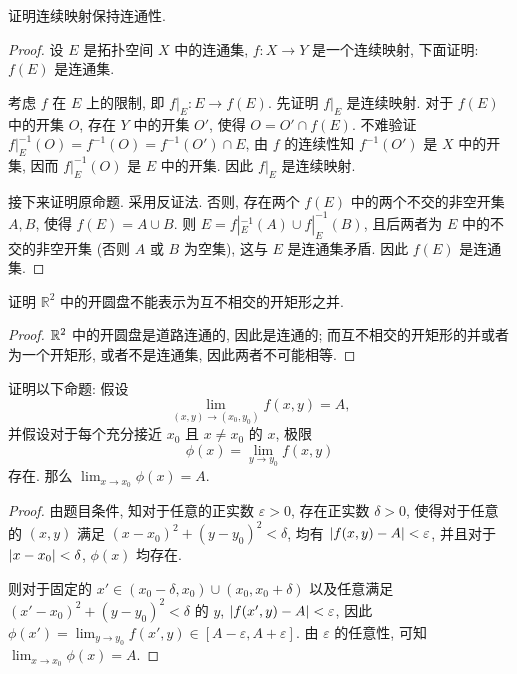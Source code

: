 \documentclass{article}
\begin{document}
\begin{problem}
  证明连续映射保持连通性.
\end{problem}

\begin{proof}
	设 $E$ 是拓扑空间 $X$ 中的连通集, $f:X\to Y$ 是一个连续映射, 下面证明: $f(E)$ 是连通集.

	考虑 $f$ 在 $E$ 上的限制, 即 $f|_E: E\to f(E)$. 先证明 $f|_E$ 是连续映射. 对于 $f(E)$ 中的开集 $O$, 存在 $Y$ 中的开集 $O'$, 使得 $O=O'\cap f(E)$. 不难验证 $f|_E^{-1}(O) = f^{-1}(O) = f^{-1}(O')\cap E$, 由 $f$ 的连续性知 $f^{-1}(O')$ 是 $X$ 中的开集, 因而 $f|_E^{-1}(O)$ 是 $E$ 中的开集. 因此 $f|_E$ 是连续映射.
	
	接下来证明原命题. 采用反证法. 否则, 存在两个 $f(E)$ 中的两个不交的非空开集 $A,B$, 使得 $f(E) = A\cup B$. 则 $E = f|_E^{-1}(A) \cup f|_E^{-1}(B)$, 且后两者为 $E$ 中的不交的非空开集 (否则 $A$ 或 $B$ 为空集), 这与 $E$ 是连通集矛盾. 因此 $f(E)$ 是连通集.
\end{proof}



\begin{problem}
  证明 $\mathbb{R}^2$ 中的开圆盘不能表示为互不相交的开矩形之并.
\end{problem}

\begin{proof}
	$\mathbb{R}^2$ 中的开圆盘是道路连通的, 因此是连通的; 而互不相交的开矩形的并或者为一个开矩形, 或者不是连通集, 因此两者不可能相等.
\end{proof}



\begin{problem}
  证明以下命题: 假设
  \[
    \lim_{(x,y)\to(x_0,y_0)} f(x,y)=A,
  \]
  并假设对于每个充分接近 $x_0$ 且 $x\ne x_0$ 的 $x$, 极限
  \[
    \phi(x)=\lim_{y\to y_0} f(x,y)
  \]
  存在. 那么 $\lim_{x\to x_0}\phi(x)=A$.
\end{problem}

\begin{proof}
	由题目条件, 知对于任意的正实数 $\varepsilon>0$, 存在正实数 $\delta>0$, 使得对于任意的 $(x,y)$ 满足 $(x-x_0)^2+(y-y_0)^2<\delta$, 均有 $\left|f(x,y)-A\right| < \varepsilon$, 并且对于 $\left|x-x_0\right|<\delta$, $\phi(x)$ 均存在. 
	
	则对于固定的 $x'\in (x_0-\delta,x_0)\cup (x_0,x_0+\delta)$ 以及任意满足 $(x'-x_0)^2+(y-y_0)^2<\delta$ 的 $y$, $\left|f(x',y)-A\right|<\varepsilon$, 因此 $\phi(x') = \lim_{y \to y_0}f(x',y) \in [A-\varepsilon,A+\varepsilon]$. 由 $\varepsilon$ 的任意性, 可知 $\lim_{x\to x_0}\phi(x)=A$.
\end{proof}
\end{document}
